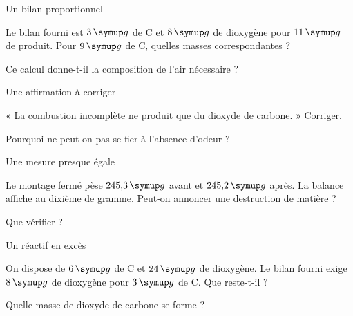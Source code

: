 \par\noindent\begin{minipage}{\linewidth}
\begin{exercice}[2]{Un bilan proportionnel}
\begin{questions}
\item Le bilan fourni est $3\unite g$ de C et $8\unite g$ de dioxygène pour $11\unite g$ de produit. Pour $9\unite g$ de C, quelles masses correspondantes ?
\item Ce calcul donne-t-il la composition de l’air nécessaire ?
\end{questions}
\end{exercice}
\end{minipage}
\clearpage{}
\par\noindent\begin{minipage}{\linewidth}
\begin{exercice}[3]{Une affirmation à corriger}
\begin{questions}
\item « La combustion incomplète ne produit que du dioxyde de carbone. » Corriger.
\item Pourquoi ne peut-on pas se fier à l’absence d’odeur ?
\end{questions}
\end{exercice}
\end{minipage}
\par\noindent\begin{minipage}{\linewidth}
\begin{exercice}[3]{Une mesure presque égale}
\begin{questions}
\item Le montage fermé pèse $245{,}3\unite g$ avant et $245{,}2\unite g$ après. La balance affiche au dixième de gramme. Peut-on annoncer une destruction de matière ?
\item Que vérifier ?
\end{questions}
\end{exercice}
\end{minipage}
\par\noindent\begin{minipage}{\linewidth}
\begin{exercice}[3]{Un réactif en excès}
\begin{questions}
\item On dispose de $6\unite g$ de C et $24\unite g$ de dioxygène. Le bilan fourni exige $8\unite g$ de dioxygène pour $3\unite g$ de C. Que reste-t-il ?
\item Quelle masse de dioxyde de carbone se forme ?
\end{questions}
\end{exercice}
\end{minipage}
